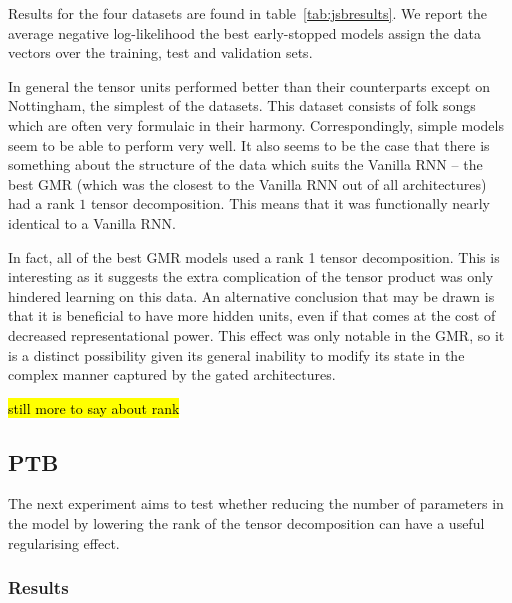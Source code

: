Results for the four datasets are found in table~\ref{tab:jsbresults}. We report the average
negative log-likelihood the best early-stopped models assign the data vectors over
the training, test and validation sets.

In general the tensor units performed better than their counterparts except on
Nottingham, the simplest of the datasets. This dataset consists of folk songs which
are often very formulaic in their harmony. Correspondingly, simple models seem to be able to
perform very well. It also seems to be the case that there is something about the structure
of the data which suits the Vanilla RNN -- the best GMR (which was the closest to the
Vanilla RNN out of all architectures) had a rank \(1\) tensor decomposition. This means
that it was functionally nearly identical to a Vanilla RNN.

In fact, all of the best GMR models used a rank 1 tensor decomposition. This is interesting
as it suggests the extra complication of the tensor product was only hindered learning on
this data. An alternative conclusion that may be drawn is that it is beneficial to have more
hidden units, even if that comes at the cost of decreased representational power. This effect
was only notable in the GMR, so it is a distinct possibility given its general inability
to modify its state in the complex manner captured by the gated architectures.

\hl{still more to say about rank}

\subsection{PTB}
The next experiment aims to test whether reducing the number of parameters in the model by lowering
the rank of the tensor decomposition can have a useful regularising effect.


\subsubsection{Results}

